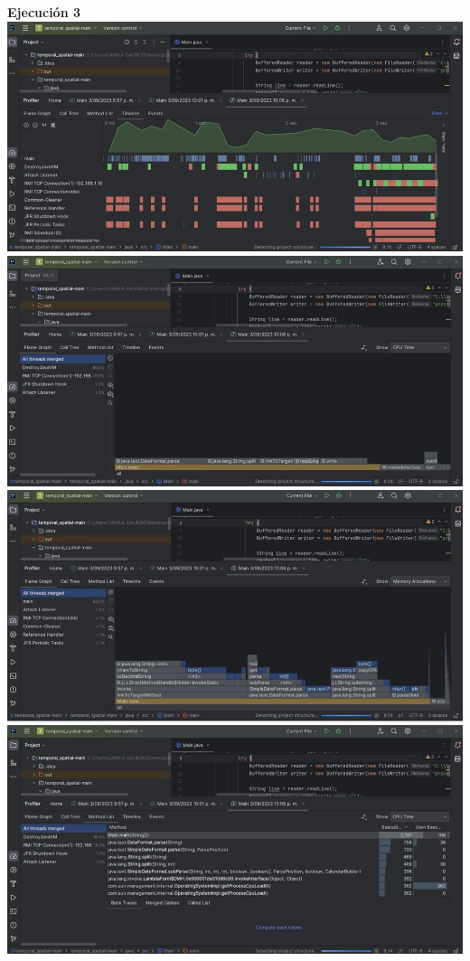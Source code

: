 \documentclass[a4paper,twocolumn,10pt]{article}
\begin{document}
\textbf{Ejecución 3\\}
\includegraphics[width=0.9\linewidth]{Lenovo AMD 3020e/TimeLine 3.jpeg}
\includegraphics[width=0.9\linewidth]{Lenovo AMD 3020e/FlameGraph CPU Time 3.jpeg}
\includegraphics[width=0.9\linewidth]{Lenovo AMD 3020e/FlameGraph Memory Allocation 3.jpeg}
\includegraphics[width=0.9\linewidth]{Lenovo AMD 3020e/Method List CPU Time 3.jpeg}
\end{document}
